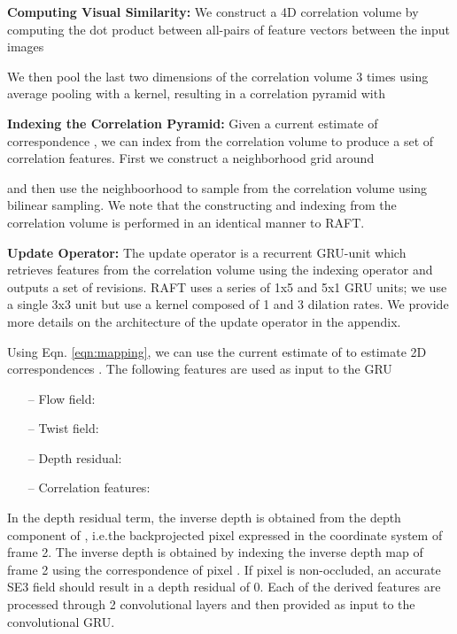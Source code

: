 \documentclass[final]{cvpr}
\begin{document}
\vspace{1mm} \noindent \textbf{Computing Visual Similarity:} We construct a 4D correlation volume by computing the dot product between all-pairs of feature vectors between the input images

We then pool the last two dimensions of the correlation volume 3 times using average pooling with a  kernel, resulting in a correlation pyramid  with


\vspace{1mm} \noindent \textbf{Indexing the Correlation Pyramid: } Given a current estimate of correspondence , we can index from the correlation volume to produce a set of correlation features. First we construct a neighborhood grid around 

and then use the neighboorhood to sample from the correlation volume using bilinear sampling. We note that the constructing and indexing from the correlation volume is performed in an identical manner to RAFT\cite{teed2020deepv2d}.

\vspace{1mm} \noindent \textbf{Update Operator:} The update operator is a recurrent GRU-unit which retrieves features from the correlation volume using the indexing operator and outputs a set of revisions. RAFT uses a series of 1x5 and 5x1 GRU units; we use a single 3x3 unit but use a kernel composed of 1 and 3 dilation rates. We provide more details on the architecture of the update operator in the appendix.

Using Eqn. \ref{eqn:mapping}, we can use the current estimate of  to estimate 2D correspondences . The following features are used as input to the GRU
\begin{itemize}
\item[--] Flow field:  
\item[--] Twist field:  
\item[--] Depth residual: 
\item[--] Correlation features: 
\end{itemize}
In the depth residual term, the inverse depth  is obtained from the depth component of , i.e.\@ the backprojected pixel  expressed in the coordinate system of frame 2. The inverse depth  is obtained by indexing the inverse depth map of frame 2 using
the correspondence  of pixel .
If pixel  is non-occluded, an accurate SE3 field  should result in a depth residual of 0. Each of the derived features are processed through 2 convolutional layers and then provided as input to the convolutional GRU.
\end{document}
